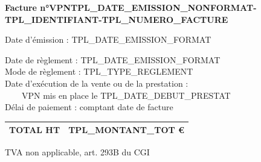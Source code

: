 \documentclass[10pt,a4paper]{article}
\begin{document}
\vspace{0.5cm}

\textbf{Facture n°VPNTPL_DATE_EMISSION_NONFORMAT-TPL_IDENTIFIANT-TPL_NUMERO_FACTURE}

Date d'émission : TPL_DATE_EMISSION_FORMAT\\

\vspace{0.5cm}


\vspace{0.5cm}

\begin{multicols}{2}

\begin{flushleft}

Date de règlement : TPL_DATE_EMISSION_FORMAT\\
Mode de règlement : TPL_TYPE_REGLEMENT\\
Date d’exécution de la vente ou de la prestation : \\
~~~~VPN mis en place le TPL_DATE_DEBUT_PRESTAT\\
Délai de paiement : comptant date de facture

\end{flushleft}

\columnbreak

\begin{flushright}
    \begin{tabular}{ |c|c| }
          \hline
          TOTAL HT & TPL_MONTANT_TOT \euro{} \\
            \hline
        \end{tabular}

    TVA non applicable, art. 293B du CGI
\end{flushright}

\end{multicols}
\end{document}
